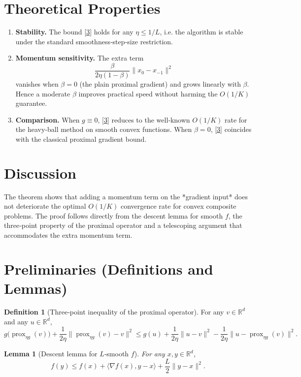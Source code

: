\documentclass[12pt]{article}
\newtheorem{lemma}{Lemma}
\theoremstyle{definition}
\newtheorem{definition}{Definition}
\newcommand{\prox}{\operatorname{prox}}
\newcommand{\R}{\mathbb{R}}
\begin{document}
\section*{Theoretical Properties}
\begin{enumerate}[label=\arabic*.]
\item \textbf{Stability.} The bound \eqref{3} holds for any $\eta\le 1/L$, i.e. the algorithm is stable under the standard smoothness‑step‑size restriction.
\item \textbf{Momentum sensitivity.} The extra term 
\[
\frac{\beta}{2\eta(1-\beta)}\|x_{0}-x_{-1}\|^{2}
\]
vanishes when $\beta=0$ (the plain proximal gradient) and grows linearly with $\beta$. Hence a moderate $\beta$ improves practical speed without harming the $O(1/K)$ guarantee.
\item \textbf{Comparison.} When $g\equiv0$, \eqref{3} reduces to the well‑known $O(1/K)$ rate for the heavy‑ball method on smooth convex functions. When $\beta=0$, \eqref{3} coincides with the classical proximal gradient bound.
\end{enumerate}

\section*{Discussion}
The theorem shows that adding a momentum term on the *gradient input* does not deteriorate the optimal $O(1/K)$ convergence rate for convex composite problems. The proof follows directly from the descent lemma for smooth $f$, the three‑point property of the proximal operator and a telescoping argument that accommodates the extra momentum term.

\newpage
\section*{Preliminaries (Definitions and Lemmas)}
\begin{definition}[Three‑point inequality of the proximal operator]\label{def:prox-ineq}
For any $v\in\R^{d}$ and any $u\in\R^{d}$,
\[
g\bigl(\prox_{\eta g}(v)\bigr)+\frac{1}{2\eta}\bigl\|\prox_{\eta g}(v)-v\bigr\|^{2}
\le g(u)+\frac{1}{2\eta}\|u-v\|^{2}
-\frac{1}{2\eta}\bigl\|u-\prox_{\eta g}(v)\bigr\|^{2}.
\tag{4}
\]
\end{definition}

\begin{lemma}[Descent lemma for $L$‑smooth $f$]\label{lem:descent}
For any $x,y\in\R^{d}$,
\[
f(y)\le f(x)+\langle\nabla f(x),y-x\rangle+\frac{L}{2}\|y-x\|^{2}.
\tag{5}
\]
\end{lemma}
\end{document}

